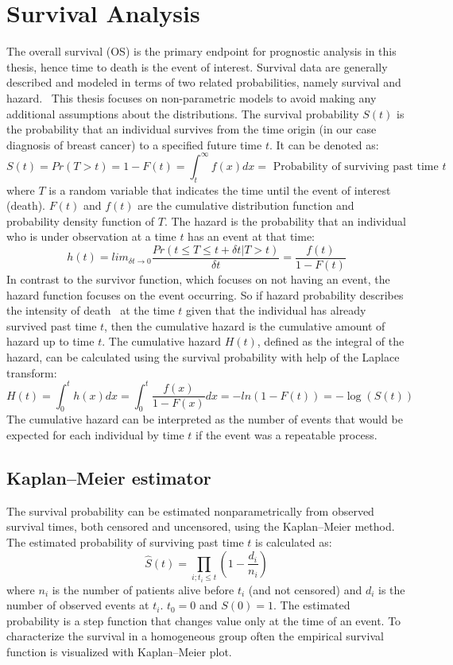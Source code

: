 \section{Survival Analysis}
The overall survival (OS) is the primary endpoint for prognostic analysis in this thesis,
hence time to death is the event of interest. 
Survival data are generally described and modeled in terms of two related probabilities, namely survival and hazard.~\cite{clark2003survival}
This thesis focuses on non-parametric models to avoid making any additional assumptions about the distributions.
The survival probability $S(t)$ is the probability that an individual survives from the time origin (in our case diagnosis of breast cancer) to a specified future time $t$.
It can be denoted as: $$S(t) = Pr(T>t) = 1-F(t) = \int_t^\infty f(x) dx = \textrm{ Probability of surviving past time } t $$
where $T$ is a random variable that indicates the time until the event of interest (death). $F(t)$ and $f(t)$ are the cumulative distribution function
and probability density function of $T$. 
The hazard is the probability that an individual who is under observation at a time $t$ has an event at that time:
$$h(t) = lim_{\delta t \rightarrow 0}\frac{Pr(t \leq T \leq t + \delta t | T > t)}{\delta t} = \frac{f(t)}{1-F(t)}$$
In contrast to the survivor function, which focuses on not having an event, the hazard function focuses on the event occurring. 
So if hazard probability describes the intensity of death~\cite{STAT_425} at the
time $t$ given that the individual has already survived past time $t$, then
the cumulative hazard is the cumulative amount of hazard up to time $t$.
The cumulative hazard $H(t)$, defined as the integral of the hazard,
can be calculated using the survival probability with help of the Laplace transform:
$$ H(t) = \int_0^t h(x) dx = \int_0^t \frac{f(x)}{1-F(x)} dx = - ln(1 - F(t)) = - \log (S(t)) $$
The cumulative hazard can be interpreted as the number of events that would be expected for each individual by time $t$ if the event was a repeatable process.~\cite{clark2003survival}

\subsection{Kaplan–Meier estimator}
The survival probability can be estimated nonparametrically from observed survival times,
both censored and uncensored, using the Kaplan–Meier method.
The estimated probability of surviving past time $t$ is calculated as:
$$\hat{S}(t) = \prod_{i; t_i \leq t} (1-\frac{d_i}{n_i})$$
where $n_i$ is the number of patients alive before $t_i$ (and not censored) and $d_i$ is the number of observed events at $t_i$. $t_0=0$ and $S(0)=1$.
The estimated probability is a step function that changes value only at the time of an event.
To characterize the survival in a homogeneous group often the empirical survival function is visualized with Kaplan–Meier plot.

